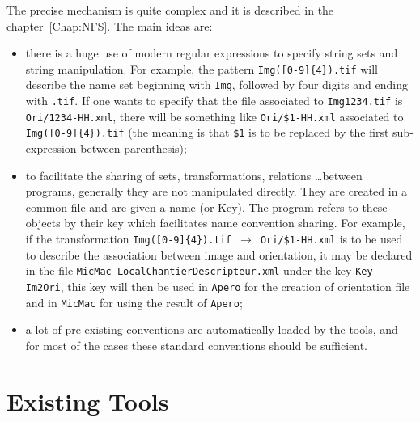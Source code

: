 The precise mechanism is quite complex and it is described in the chapter~\ref{Chap:NFS}. 
The main ideas are:

\begin{itemize}
   \item there is a huge use of modern regular expressions to specify string sets and
         string manipulation. For example, the pattern {\tt Img([0-9]\{4\}).tif} will
         describe the name set beginning with {\tt Img}, followed by four digits and ending
         with {\tt .tif}. If one wants to specify that the file associated  to {\tt Img1234.tif}
         is {\tt Ori/1234-HH.xml}, there will be something like {\tt  Ori/\$1-HH.xml} associated
        to {\tt Img([0-9]\{4\}).tif}  (the meaning is that {\tt \$1}  is to be replaced by 
          the first sub-expression between parenthesis);



   \item to facilitate the sharing of sets, transformations, relations \dots between programs,
         generally they are not manipulated directly. They are created in a common file and
         are given a name (or Key). The program refers to these objects by their key which
         facilitates name convention sharing. For example, if the transformation
         {\tt Img([0-9]\{4\}).tif $\rightarrow$  Ori/\$1-HH.xml} is to be used
         to describe the association between image and orientation, it  may be declared in
         the file {\tt MicMac-LocalChantierDescripteur.xml} under the key {\tt Key-Im2Ori},
         this key will then be used in {\tt Apero} for the creation of orientation file and in
         {\tt MicMac} for using the result of {\tt Apero};
         
          
     \item a lot of pre-existing conventions are automatically loaded by the tools, and
           for most of the cases these standard conventions should be sufficient.
\end{itemize}




\section{Existing Tools}


\label{Gen:ExTools}

